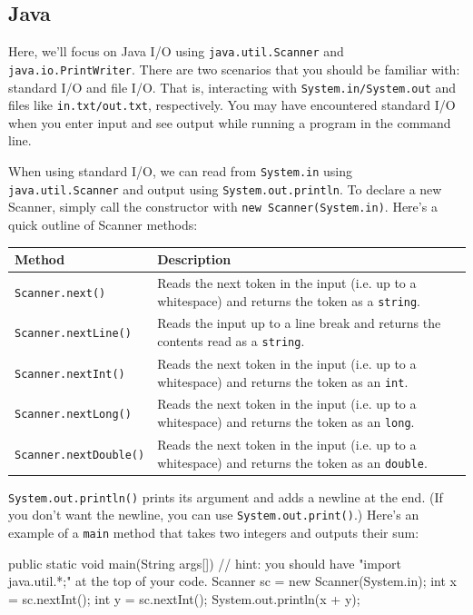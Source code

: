 \subsection{Java}
Here, we'll focus on Java I/O using \texttt{java.util.Scanner} and \texttt{java.io.PrintWriter}. There are two scenarios that you should be familiar with: standard I/O and file I/O. That is, interacting with \texttt{System.in/System.out} and files like \texttt{in.txt/out.txt}, respectively. You may have encountered standard I/O when you enter input and see output while running a program in the command line.

When using standard I/O, we can read from \texttt{System.in} using \texttt{java.util.Scanner} and output using \texttt{System.out.println}. To declare a new Scanner, simply call the constructor with \texttt{new Scanner(System.in)}. Here's a quick outline of Scanner methods:
\begin{center}
  \begin{tabularx}{0.75\textwidth}{|l|X|}
    \hline
    Method & Description \\ \hline
    \texttt{Scanner.next()} & Reads the next token in the input (i.e. up to a whitespace) and returns the token as a \texttt{string}. \\ \hline
    \texttt{Scanner.nextLine()} & Reads the input up to a line break and returns the contents read as a \texttt{string}. \\ \hline
    \texttt{Scanner.nextInt()} & Reads the next token in the input (i.e. up to a whitespace) and returns the token as an \texttt{int}. \\ \hline
    \texttt{Scanner.nextLong()} & Reads the next token in the input (i.e. up to a whitespace) and returns the token as an \texttt{long}. \\ \hline
    \texttt{Scanner.nextDouble()} & Reads the next token in the input (i.e. up to a whitespace) and returns the token as an \texttt{double}. \\ \hline
  \end{tabularx}
\end{center}
\texttt{System.out.println()} prints its argument and adds a newline at the end. (If you don't want the newline, you can use \texttt{System.out.print()}.) Here's an example of a \texttt{main} method that takes two integers and outputs their sum:

\begin{mylstlisting}
public static void main(String args[]) {
  // hint: you should have "import java.util.*;" at the top of your code.
  Scanner sc = new Scanner(System.in);
  int x = sc.nextInt();
  int y = sc.nextInt();
  System.out.println(x + y);
}
\end{mylstlisting}

